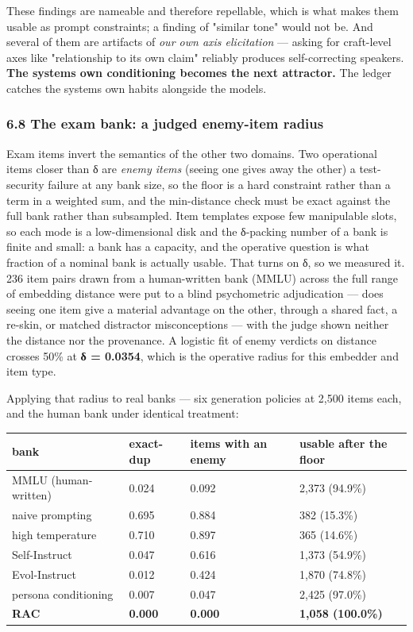 \documentclass[
  11pt,
]{article}
\theoremstyle{plain}
\theoremstyle{definition}
\begin{document}
These findings are nameable and therefore repellable, which is what
makes them usable as prompt constraints; a finding of "similar tone"
would not be. And several of them are artifacts of \emph{our own axis
elicitation} --- asking for craft-level axes like "relationship to its
own claim" reliably produces self-correcting speakers. \textbf{The
system\textquotesingle s own conditioning becomes the next attractor.}
The ledger catches the system\textquotesingle s own habits alongside the
model\textquotesingle s.

\subsubsection{6.8 The exam bank: a judged enemy-item
radius}\label{68-the-exam-bank-a-judged-enemy-item-radius}

Exam items invert the semantics of the other two domains. Two
operational items closer than δ are \emph{enemy items} (seeing one gives
away the other) a test-security failure at any bank size, so the floor
is a hard constraint rather than a term in a weighted sum, and the
min-distance check must be exact against the full bank rather than
subsampled. Item templates expose few manipulable slots, so each mode is
a low-dimensional disk and the δ-packing number of a bank is finite and
small: a bank has a capacity, and the operative question is what
fraction of a nominal bank is actually usable. That turns on δ, so we
measured it. 236 item pairs drawn from a human-written bank (MMLU)
across the full range of embedding distance were put to a blind
psychometric adjudication --- does seeing one item give a material
advantage on the other, through a shared fact, a re-skin, or matched
distractor misconceptions --- with the judge shown neither the distance
nor the provenance. A logistic fit of enemy verdicts on distance crosses
50\% at \textbf{δ = 0.0354}, which is the operative radius for this
embedder and item type.

Applying that radius to real banks --- six generation policies at 2,500
items each, and the human bank under identical treatment:

\begin{longtable}[]{@{}llll@{}}
\toprule\noalign{}
bank & exact-dup & items with an enemy & usable after the floor \\
\midrule\noalign{}
\endhead
\bottomrule\noalign{}
\endlastfoot
MMLU (human-written) & 0.024 & 0.092 & 2,373 (94.9\%) \\
naive prompting & 0.695 & 0.884 & 382 (15.3\%) \\
high temperature & 0.710 & 0.897 & 365 (14.6\%) \\
Self-Instruct & 0.047 & 0.616 & 1,373 (54.9\%) \\
Evol-Instruct & 0.012 & 0.424 & 1,870 (74.8\%) \\
persona conditioning & 0.007 & 0.047 & 2,425 (97.0\%) \\
\textbf{RAC} & \textbf{0.000} & \textbf{0.000} & \textbf{1,058
(100.0\%)} \\
\end{longtable}
\end{document}
